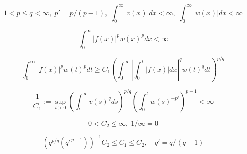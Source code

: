 $$
1<p\le q<\infty,\;p'=p/(p-1),\;\int^\infty_0|v(x)|dx<\infty,\;\int^\infty_0|w(x)|dx<\infty
$$

$$
\int^\infty_0|f(x)|^pw(x)^p dx<\infty
$$

$$
\int^\infty_0|f(x)|^p w(t)^p dt \ge C_1\left(\int^\infty_0\left|\int^t_0|f(x)|dx\right|^q w(t)^q dt\right)^{p/q}
$$

$$
\frac{1}{C_1}:=\sup_{t>0}\left(\int^\infty_t v(s)^q ds\right)^{p/q}\left(\int^t_0 w(s)^{-p'}\right)^{p-1}<\infty
$$

$$
0<C_2\le \infty,\; 1/\infty=0
$$

$$
\left(q^{p/q}(q'^{p-1})\right)^{-1}C_2 \le C_1 \le C_2,\quad q'=q/(q-1)
$$
